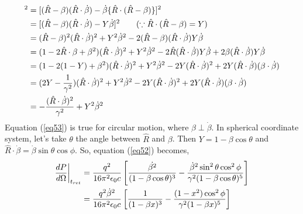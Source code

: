 \documentclass[11pt,a4paper]{article}
\begin{document}
\begin{align}
    [\hat{R}\times \{ (\hat{R} - \beta) \times \dot{\beta} \}]^2 &= [(\hat{R} - \beta)(\hat{R} \cdot \dot{\beta}) - \dot{\beta}\{\hat{R}\cdot (\hat{R} - \beta)\}]^2 \notag \\
                                                                 &= [(\hat{R} - \beta)(\hat{R} \cdot \dot{\beta}) - Y\dot{\beta}]^2 \tag{$\because \hat{R}\cdot (\hat{R} - \beta) = Y$} \\
                                                                 &= (\hat{R} - \beta)^2(\hat{R} \cdot \dot{\beta})^2 + Y^2\dot{\beta}^2 - 2(\hat{R} - \beta)(\hat{R} \cdot \dot{\beta})Y\dot{\beta}  \notag \\
                                                                 &= (1 - 2\hat{R}\cdot \beta +\beta^2)(\hat{R} \cdot \dot{\beta})^2 + Y^2\dot{\beta}^2 - 2\hat{R}(\hat{R} \cdot \dot{\beta})Y\dot{\beta} + 2\beta (\hat{R} \cdot \dot{\beta})Y\dot{\beta} \notag \\
                                                                 &= (1 - 2(1-Y) +\beta^2)(\hat{R} \cdot \dot{\beta})^2 + Y^2\dot{\beta}^2 - 2Y(\hat{R} \cdot \dot{\beta})^2 + 2Y(\hat{R} \cdot \dot{\beta}) (\beta \cdot \dot{\beta}) \notag \\
                                                                 &= (2Y - \frac{1}{\gamma^2})(\hat{R} \cdot \dot{\beta})^2 + Y^2\dot{\beta}^2 - 2Y(\hat{R} \cdot \dot{\beta})^2 + 2Y(\hat{R} \cdot \dot{\beta}) (\beta \cdot \dot{\beta}) \notag \\
                                                                 &= -\frac{(\hat{R} \cdot \dot{\beta})^2}{\gamma^2} + Y^2\dot{\beta}^2 \label{eq53}
\end{align}
Equation (\ref{eq53}) is true for circular motion, where $\beta \perp \dot{\beta}$. 
In spherical coordinate system, let's take $\theta$ the angle between $\hat{R}$ and $\beta$.
Then $Y = 1 - \beta \cos{\theta}$ and $\hat{R}\cdot \dot{\beta} = \dot{\beta} \sin{\theta} \cos{\phi}$.
So, equation (\ref{eq52}) becomes,
\begin{align}
    \frac{dP}{d\Omega}\biggl|_{t_{ret}} &= \frac{q^2}{16\pi^2 \epsilon_0c} \left[ \frac{\dot{\beta^2}}{(1-\beta \cos{\theta})^3} - \frac{\dot{\beta}^2\sin^2{\theta}\cos^2{\phi}}{\gamma^2(1-\beta \cos{\theta})^5} \right] \notag \\
                                        &= \frac{q^2\dot{\beta}^2}{16\pi^2 \epsilon_0c} \left[ \frac{1}{(1-\beta x)^3} - \frac{(1-x^2)\cos^2{\phi}}{\gamma^2(1-\beta x)^5} \right] \notag
\end{align}
\end{document}
